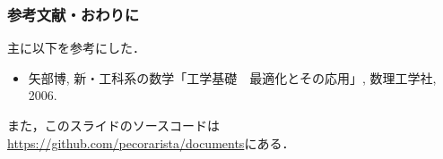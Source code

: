 \documentclass[10pt,hyperref={unicode}]{beamer}
\begin{document}
%
\begin{frame}
\frametitle{参考文献・おわりに}
主に以下を参考にした．

\bigskip

\begin{itemize}
    \item 矢部博, 新・工科系の数学「工学基礎　最適化とその応用」,
        数理工学社, 2006.
\end{itemize}

\bigskip

また，このスライドのソースコードは
\href{https://github.com/pecorarista/documents}{https://github.com/pecorarista/documents}にある．
\end{frame}
\end{document}
